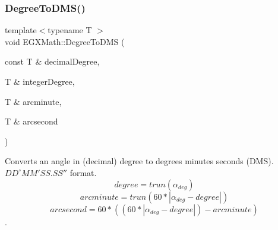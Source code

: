 \subsubsection{\texorpdfstring{Degree\+To\+D\+M\+S()}{DegreeToDMS()}}
{\footnotesize\ttfamily template$<$typename T $>$ \\
void E\+G\+X\+Math\+::\+Degree\+To\+D\+MS (\begin{DoxyParamCaption}\item[{const T \&}]{decimal\+Degree,  }\item[{T \&}]{integer\+Degree,  }\item[{T \&}]{arcminute,  }\item[{T \&}]{arcsecond }\end{DoxyParamCaption})}



Converts an angle in (decimal) degree to degrees minutes seconds (D\+MS). ${DD}^{\circ}{MM}'{SS.SS}''$ format. \[degree=trun(\alpha_{deg})\] \[arcminute=trun(60 * |\alpha_{deg} - degree|)\] \[arcsecond=60 * ((60 * |\alpha_{deg} - degree|)-arcminute)\]. 

